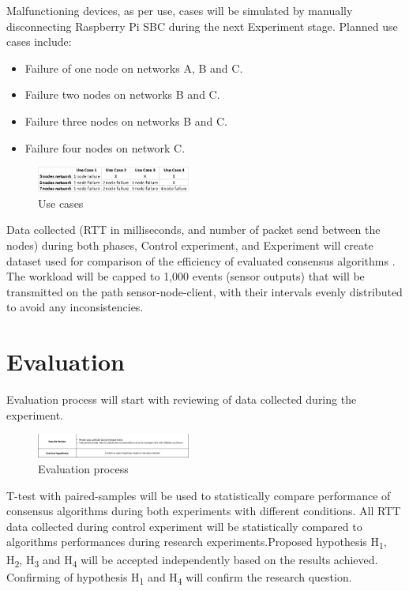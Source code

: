 \documentclass[	DIV=calc,%
							paper=a4,%
							fontsize=11pt,%
							twocolumn]{scrartcl}	 				%
\begin{document}
\smallskip \newline Malfunctioning devices, as per use,  cases will be simulated by manually disconnecting Raspberry Pi SBC during the next Experiment stage. Planned use cases include: 
\begin{itemize}
  \item Failure of one node on networks A, B and C.
  \item Failure two nodes on networks B and C.
  \item Failure three nodes on networks B and C.
  \item Failure four nodes on network C.
\end{itemize}
\begin{figure}[H]
\centering
\includegraphics[width=0.45\textwidth]{images/use_cases.png}
\caption{Use cases}
\end{figure}
\noindent Data collected (RTT in milliseconds, and number of packet send between the nodes) during both phases, Control experiment, and Experiment will create dataset used for comparison of the efficiency of evaluated consensus algorithms \cite{Hao2018EdgeConsAE,721868}. The workload
will be capped to 1,000 events (sensor outputs) that will be transmitted on the path sensor-node-client, with their intervals evenly distributed to avoid any inconsistencies.     
\section{Evaluation}
Evaluation process will start with reviewing of data collected during the experiment.
\begin{figure}[H]
\centering
\includegraphics[width=0.45\textwidth]{images/bottom_taskAndObj.png}
\caption{Evaluation process}
\end{figure}
\noindent
T-test with paired-samples will be used to statistically compare performance of consensus algorithms during both experiments with different conditions. All RTT data collected during control experiment will be statistically compared to algorithms performances during research experiments.\smallskip \newline Proposed hypothesis H\textsubscript{1}, H\textsubscript{2}, H\textsubscript{3} and H\textsubscript{4} will be accepted independently based on the results achieved. Confirming of hypothesis H\textsubscript{1} and H\textsubscript{4} will confirm the research question.
\end{document}
